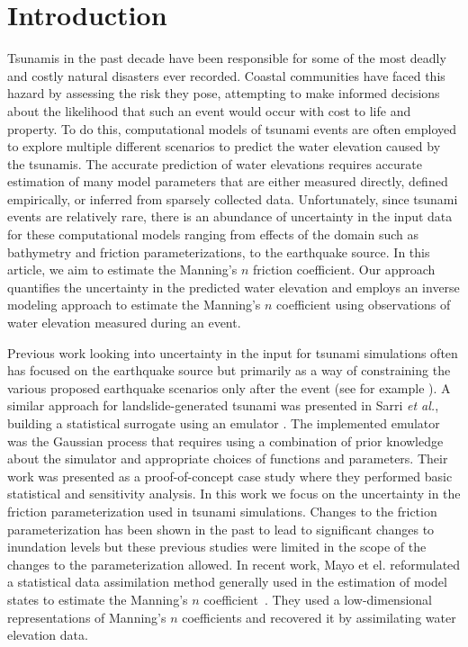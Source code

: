 
\section{Introduction}

Tsunamis in the past decade have been responsible for some of the most  deadly
and costly natural disasters ever recorded. Coastal communities  have faced this
hazard by assessing the risk they pose, attempting  to make informed decisions
about the likelihood that such an event would  occur with cost to life and
property.  To do this, computational models of  tsunami events are often
employed to explore multiple different scenarios to predict the water elevation
caused by the tsunamis. The accurate prediction  of water elevations requires
accurate estimation of many model parameters that  are either measured directly,
defined empirically, or inferred from sparsely collected data. Unfortunately,
since tsunami events are relatively rare,  there is an abundance of uncertainty
in the input data for these computational  models ranging from effects of the
domain such as bathymetry and friction parameterizations,  to the earthquake
source.  In this article, we aim to estimate the Manning's $n$ friction
coefficient. Our approach quantifies the uncertainty in the predicted water
elevation  and employs an inverse modeling approach to estimate the Manning's
$n$ coefficient using observations of water elevation measured during an event.

Previous work looking into uncertainty in the input for tsunami simulations
often has focused on the earthquake source but primarily as a way of
constraining the various proposed earthquake scenarios only after the event (see
for example \cite{MacInnes:2013cr}).  A similar approach for landslide-generated
tsunami was presented in Sarri \emph{et al.}, building a statistical surrogate
using an emulator \cite{Sarri2012}.  The implemented emulator was the Gaussian
process that requires using a combination of prior knowledge about the simulator
and appropriate choices of functions and parameters. Their work was presented as
a proof-of-concept case study where they performed basic statistical and
sensitivity analysis. In this work we focus on the uncertainty in the friction
parameterization used in tsunami simulations.  Changes to the friction
parameterization has been shown in the past to lead to significant changes to
inundation levels \cite{Myers:2001el,Jakeman:2010hk} but these previous studies
were limited in the scope of the changes to the parameterization allowed.  In
recent work, Mayo et el. reformulated a statistical data assimilation method
generally used in the estimation of model states to estimate the Manning's $n$
coefficient~\cite{Mayo2013}. They used a low-dimensional representations of
Manning's $n$ coefficients and recovered it by assimilating water elevation data.

